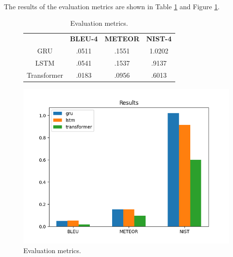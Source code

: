 \documentclass[12pt]{article}
\theoremstyle{plain}
\theoremstyle{definition}
\theoremstyle{remark}
\begin{document}
The results of the evaluation metrics are shown in Table \ref{tab:results} and Figure \ref{fig:results}.
\begin{figure}[H]
    \centering
    \begin{minipage}{0.4\textwidth}
        \begin{table}[H]
            \centering
            \fontsize{8}{10}\selectfont
            \begin{tabular}{c|c|c|c}
                & \textbf{BLEU-4} & \textbf{METEOR} & \textbf{NIST-4} \\
                GRU & .0511 & .1551 & 1.0202 \\
                LSTM & .0541 & .1537 & .9137 \\
                Transformer & .0183 & .0956 & .6013
            \end{tabular}
            \caption{Evaluation metrics.}\label{tab:results}
        \end{table}
    \end{minipage}
    \hfill
    \begin{minipage}{0.5\textwidth}
        \centering
        \includegraphics[width=.9\textwidth]{res/metrics.png}
        \caption{Evaluation metrics.}\label{fig:results}
    \end{minipage}
\end{figure}
\end{document}
